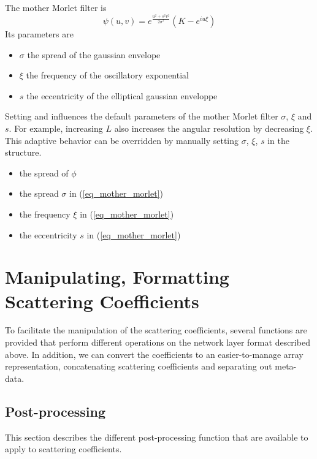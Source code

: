 \documentclass[twocolumn]{article}
\begin{document}
The mother Morlet filter is
\begin{equation}
\label{eq_mother_morlet}
\psi(u,v) = e^{ \frac{u^2 + s^2 v^2}{2 \sigma^2}}(K - e^{i u \xi})
\end{equation}
Its parameters are
\begin{itemize}
\item $\sigma$ the spread of the gaussian envelope 
\item $\xi$ the frequency of the oscillatory exponential
\item $s$ the eccentricity of the elliptical gaussian enveloppe
\end{itemize}
Setting  and  influences the default parameters of the mother Morlet filter $\sigma$, 
$\xi$ and $s$. For example, increasing $L$ also increases the angular resolution by decreasing $\xi$.
This adaptive behavior can be overridden by manually setting $\sigma$, $\xi$, $s$ in the  structure.
\begin{itemize}
	\item {} the spread of $\phi$
	\item {} the spread $\sigma$ in (\ref{eq_mother_morlet})
	\item {} the frequency $\xi$ in (\ref{eq_mother_morlet})
	\item {} the eccentricity $s$ in (\ref{eq_mother_morlet})
\end{itemize}	


\section{Manipulating, Formatting Scattering Coefficients}

To facilitate the manipulation of the scattering coefficients, several functions are provided that perform different operations on the network layer format described above. In addition, we can convert the coefficients to an easier-to-manage array representation, concatenating scattering coefficients and separating out meta-data.

\subsection{Post-processing}

This section describes the different post-processing function that are available to apply to scattering coefficients.
\end{document}
